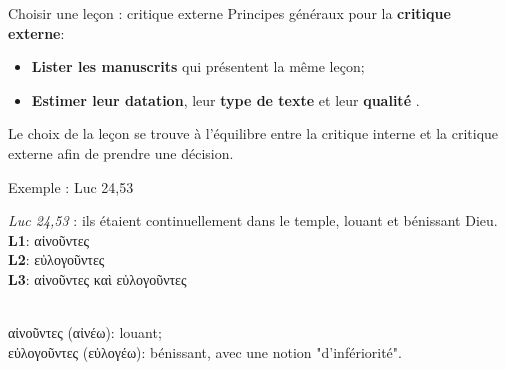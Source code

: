 \documentclass[11pt]{beamer}
\begin{document}
\begin{frame}{Choisir une leçon : critique externe}
    Principes généraux pour la \textbf{critique externe}:
    \begin{itemize}
        \item \textbf{Lister les manuscrits} qui présentent la même leçon;
        \item \textbf{Estimer leur datation}, leur \textbf{type de texte} et leur \og \textbf{qualité} \fg.
    \end{itemize}

    \begin{alertblock}{}
       Le choix de la leçon se trouve à l'équilibre entre  la critique interne et la critique externe afin de prendre une décision.
    \end{alertblock}
\end{frame}

\begin{frame}{Exemple : Luc 24,53}
    \begin{exampleblock}{}
   \textit{Luc 24,53} : ils étaient continuellement dans le temple, louant et bénissant Dieu.\\
   
   \textbf{L1}: \textgreek{αἰνοῦντες}\\
   \textbf{L2}: \textgreek{εὐλογοῦντες} \\
   \textbf{L3}: \textgreek{αἰνοῦντες καὶ εὐλογοῦντες}\\
    \end{exampleblock}
    \\
    \vfill
    \textgreek{αἰνοῦντες} (\textgreek{αἰνέω}): louant;\\
    \textgreek{εὐλογοῦντες} (\textgreek{εὐλογέω}): bénissant, avec une notion "d'infériorité".
\end{frame}
\end{document}
